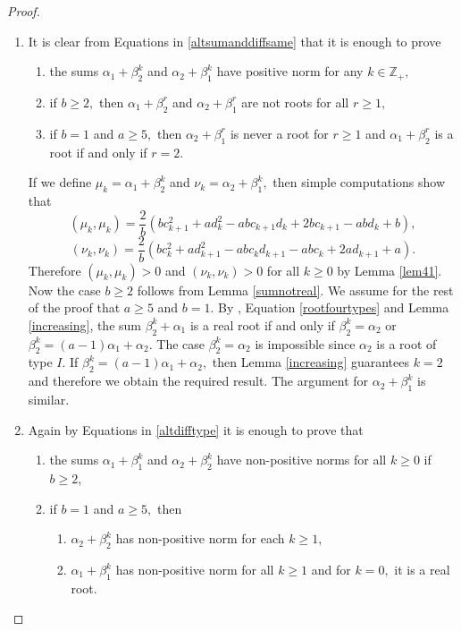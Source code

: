 \documentclass[12pt,reqno]{amsart}
\theoremstyle{plain}
\theoremstyle{definition}
\theoremstyle{remark}
\newcommand\bz{\mathbb Z}
\begin{document}
\begin{proof}
\begin{enumerate}
    \item It is clear from Equations in \ref{altsumanddiffsame} that it is enough to prove 
\begin{enumerate}
    \item the sums $\alpha_1+\beta_2^k$ and $\alpha_2+\beta_1^k$ have positive norm for any $k\in\bz_+,$
    \item if $b\geq 2,$ then $\alpha_1+\beta_2^r$ and $\alpha_2+\beta_1^r$ are not roots for all $r\geq 1,$ 
    \item if $b=1$ and $a\geq 5,$  then $\alpha_2+\beta_1^r$ is never a root for $r\geq 1$ and $\alpha_1+\beta_2^r$ is a root if and only if $r=2.$
\end{enumerate}
 If we define $\mu_k=\alpha_1+\beta_2^k$ and $\nu_k=\alpha_2+\beta_1^k,$ then simple computations show that 
 $$(\mu_k,\mu_k)=\frac{2}{b}(bc_{k+1}^2+ad_{k}^2-abc_{k+1}d_{k}+2bc_{k+1}-abd_{k}+b),$$ 
 $$(\nu_k,\nu_k)=\frac{2}{b}(bc_k^2+ad_{k+1}^2-abc_kd_{k+1}-abc_k+2ad_{k+1}+a).$$
Therefore $(\mu_k,\mu_k)>0$ and $(\nu_k,\nu_k)>0$ for all $k\geq 0$ by Lemma \ref{lem41}. Now the case $b\geq 2$ follows from Lemma \ref{sumnotreal}.
 We assume for the rest of the proof that $a\geq 5$ and $b=1.$ By \cite[Theorem 3.6]{carbone2021commutator}, Equation \ref{rootfourtypes} and Lemma \ref{increasing}, the sum $\beta_2^k+\alpha_1$ is a real root if and only if $\beta_2^k=\alpha_2$ or $\beta_2^k=(a-1)\alpha_1+\alpha_2$. The case $\beta_2^k=\alpha_2$ is impossible since $\alpha_2$ is a root of type $I.$ If $\beta_2^k=(a-1)\alpha_1+\alpha_2,$ then Lemma \ref{increasing} guarantees $k=2$ and therefore we obtain the required result. The argument for $\alpha_2+\beta_1^k$ is similar.
 \item Again by Equations in \ref{altdifftype} it is enough to prove that
\begin{enumerate}
    \item  the sums $\alpha_1+\beta_1^k$ and $\alpha_2+\beta_2^k$ have non-positive norms for all $k\geq 0$ if $b\geq 2$,
    \item if $b=1$ and $a\geq 5,$ then 
    \begin{enumerate}
        \item $\alpha_2+\beta_2^k$ has non-positive norm for each $k \geq 1,$
        \item $\alpha_1+\beta_1^k$ has non-positive norm for all $k\geq 1$ and for $k=0,$ it is a real root.
    \end{enumerate}

\end{enumerate}
\end{enumerate}
\end{proof}
\end{document}
